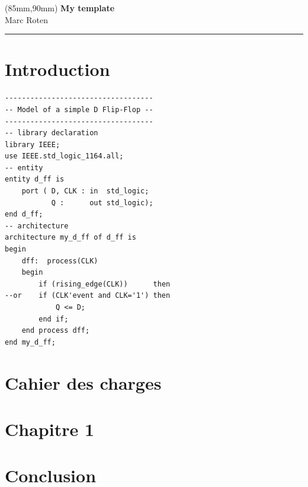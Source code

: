 \documentclass[11pt,b5paper]{book} %
\begin{document}
    	\renewcommand\contentsname{Table of Contents} %
	\tableofcontents
    \clearpage
	
	
	
	
	\null\newpage %

	\thispagestyle{empty}
	\null\newpage

	\thispagestyle{empty}
	\begin{textblock*}{60mm}(85mm,90mm)
	\noindent
	{\sffamily\LARGE\bfseries My template}\\
	\noindent
	{\sffamily\small Marc Roten}\\
	{\color{dark-gray}\rule[5pt]{170pt}{3pt}}
	\end{textblock*}
	\null\newpage

	\thispagestyle{empty}
	
	
\section{Introduction}

\begin{lstlisting}[label=exe_14, caption=Solution to Example~14.]
-----------------------------------
-- Model of a simple D Flip-Flop --
-----------------------------------
-- library declaration
library IEEE;
use IEEE.std_logic_1164.all;
-- entity
entity d_ff is 
	port ( D, CLK : in  std_logic; 
		   Q :      out std_logic); 
end d_ff; 
-- architecture
architecture my_d_ff of d_ff is 
begin
	dff:  process(CLK)
	begin
		if (rising_edge(CLK))      then
--or    if (CLK'event and CLK='1') then
			Q <= D; 
		end if; 
	end process dff; 
end my_d_ff; 
\end{lstlisting}
\newpage




\section{Cahier des charges}

\section{Chapitre 1}

\section{Conclusion}
\end{document}
